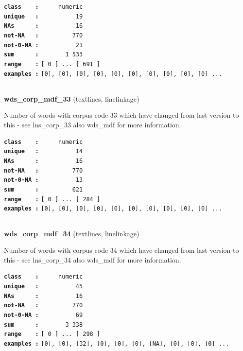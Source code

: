 \documentclass[]{article}
\begin{document}
\textbf{\texttt{class\ \ \ \ :}} \texttt{~~~~~numeric}\\
\textbf{\texttt{unique\ \ \ :}} \texttt{~~~~~~~~~~19}\\
\textbf{\texttt{NAs\ \ \ \ \ \ :}} \texttt{~~~~~~~~~~16}\\
\textbf{\texttt{not-NA\ \ \ :}} \texttt{~~~~~~~~~770}\\
\textbf{\texttt{not-0-NA\ :}} \texttt{~~~~~~~~~~21}\\
\textbf{\texttt{sum\ \ \ \ \ \ :}} \texttt{~~~~~~~1~533}\\
\textbf{\texttt{range\ \ \ \ :}}
\texttt{{[}\ 0\ {]}\ ...\ {[}\ 691\ {]}}\\
\textbf{\texttt{examples\ :}}
\texttt{{[}0{]},\ {[}0{]},\ {[}0{]},\ {[}0{]},\ {[}0{]},\ {[}0{]},\ {[}0{]},\ {[}0{]},\ {[}0{]},\ {[}0{]}\ ...}\\

~

\textbf{wds\_corp\_mdf\_33} (textlines, linelinkage)

Number of words with corpus code 33 which have changed from last version
to this - see lns\_corp\_33 also wds\_mdf for more information.

\textbf{\texttt{class\ \ \ \ :}} \texttt{~~~~~numeric}\\
\textbf{\texttt{unique\ \ \ :}} \texttt{~~~~~~~~~~14}\\
\textbf{\texttt{NAs\ \ \ \ \ \ :}} \texttt{~~~~~~~~~~16}\\
\textbf{\texttt{not-NA\ \ \ :}} \texttt{~~~~~~~~~770}\\
\textbf{\texttt{not-0-NA\ :}} \texttt{~~~~~~~~~~13}\\
\textbf{\texttt{sum\ \ \ \ \ \ :}} \texttt{~~~~~~~~~621}\\
\textbf{\texttt{range\ \ \ \ :}}
\texttt{{[}\ 0\ {]}\ ...\ {[}\ 284\ {]}}\\
\textbf{\texttt{examples\ :}}
\texttt{{[}0{]},\ {[}0{]},\ {[}0{]},\ {[}0{]},\ {[}0{]},\ {[}0{]},\ {[}0{]},\ {[}0{]},\ {[}0{]},\ {[}0{]}\ ...}\\

~

\textbf{wds\_corp\_mdf\_34} (textlines, linelinkage)

Number of words with corpus code 34 which have changed from last version
to this - see lns\_corp\_34 also wds\_mdf for more information.

\textbf{\texttt{class\ \ \ \ :}} \texttt{~~~~~numeric}\\
\textbf{\texttt{unique\ \ \ :}} \texttt{~~~~~~~~~~45}\\
\textbf{\texttt{NAs\ \ \ \ \ \ :}} \texttt{~~~~~~~~~~16}\\
\textbf{\texttt{not-NA\ \ \ :}} \texttt{~~~~~~~~~770}\\
\textbf{\texttt{not-0-NA\ :}} \texttt{~~~~~~~~~~69}\\
\textbf{\texttt{sum\ \ \ \ \ \ :}} \texttt{~~~~~~~3~338}\\
\textbf{\texttt{range\ \ \ \ :}}
\texttt{{[}\ 0\ {]}\ ...\ {[}\ 298\ {]}}\\
\textbf{\texttt{examples\ :}}
\texttt{{[}0{]},\ {[}0{]},\ {[}32{]},\ {[}0{]},\ {[}0{]},\ {[}0{]},\ {[}NA{]},\ {[}0{]},\ {[}0{]},\ {[}0{]}\ ...}\\
\end{document}
